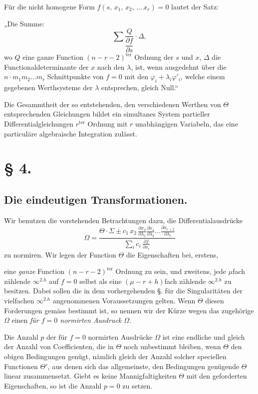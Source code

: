 \documentclass{article}
\begin{document}
Für die nicht homogene Form $f(s,\, x_1,\, x_2,\, \dots\, x_r) = 0$ lautet der Satz:

„Die Summe:
\[
\sum \frac{Q}{\dfrac{\partial f}{\partial s}} \cdot \varDelta,
\]
wo $Q$ eine ganze Function $(n - r - 2)^{\text{ter}}$ Ordnung der $s$ und $x$, $\varDelta$ die Functionaldeterminante der $x$ nach den $\lambda$, ist, wenn ausgedehnt über die $n \cdot m_1 m_2 \dots m_r$ Schnittpunkte von $f = 0$ mit den $\varphi_i + \lambda_i \varphi'_i$, welche einem gegebenen Werthsysteme der $\lambda$ entsprechen, gleich Null.“

Die Gesammtheit der so entstehenden, den verschiedenen Werthen von $\Theta$ entsprechenden Gleichungen bildet ein simultanes System partieller Differentialgleichungen $r^{\text{ter}}$ Ordnung mit $r$ unabhängigen Variabeln, das eine particuläre algebraische Integration zulässt.


\section*{§ 4.}

\subsection*{Die eindeutigen Transformationen.}

Wir benutzen die vorstehenden Betrachtungen dazu, die Differentialausdrücke
\[
\Omega = \frac{\Theta \cdot \Sigma \pm c_1\, x_2\, \frac{\partial x_3}{\partial \lambda_1} \frac{\partial x_4}{\partial \lambda_2} \dots \frac{\partial x_{r+2}}{\partial \lambda_r}}{\displaystyle\sum_i c_i\, \frac{\partial f}{\partial x_i}}
\]
zu normiren. Wir legen der Function $\Theta$ die Eigenschaften bei, erstens,

eine \emph{ganze} Function $(n - r - 2)^{\text{ter}}$ Ordnung zu sein, und zweitens, jede $\mu$fach zählende $\infty^{2.h}$ auf $f = 0$ selbst als eine $(\mu - r + h)$fach zählende $\infty^{2.h}$ zu besitzen. Dabei sollen die in dem vorhergehenden §. für die Singularitäten der vielfachen $\infty^{2.h}$ angenommenen Voraussetzungen gelten. Wenn $\Theta$ diesen Forderungen gemäss bestimmt ist, so nennen wir der Kürze wegen das zugehörige $\Omega$ einen \emph{für $f = 0$ normirten Ausdruck $\Omega$}.

Die Anzahl $p$ der für $f = 0$ normirten Ausdrücke $\Omega$ ist eine endliche und gleich der Anzahl von Coefficienten, die in $\Theta$ noch unbestimmt bleiben, wenn $\Theta$ den obigen Bedingungen genügt, nämlich gleich der Anzahl solcher speciellen Functionen $\Theta'$, aus denen sich das allgemeinste, den Bedingungen genügende $\Theta$ linear zusammensetzt. Giebt es keine Mannigfaltigkeiten $\Theta$ mit den geforderten Eigenschaften, so ist die Anzahl $p = 0$ zu setzen.
\end{document}
